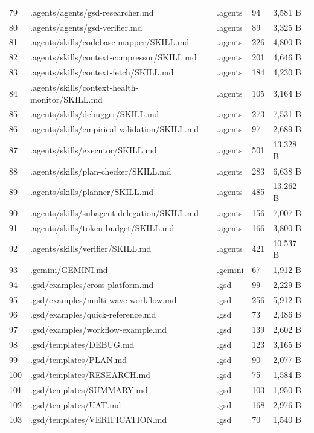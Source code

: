 \documentclass[11pt,a4paper,oneside]{book}
\begin{document}
\begin{longtable}{l l l l l}
79 & .agents/agents/gsd-researcher.md & .agents & 94 & 3,581 B \\
80 & .agents/agents/gsd-verifier.md & .agents & 89 & 3,325 B \\
81 & .agents/skills/codebase-mapper/SKILL.md & .agents & 226 & 4,800 B \\
82 & .agents/skills/context-compressor/SKILL.md & .agents & 201 & 4,646 B \\
83 & .agents/skills/context-fetch/SKILL.md & .agents & 184 & 4,230 B \\
84 & .agents/skills/context-health-monitor/SKILL.md & .agents & 105 & 3,164 B \\
85 & .agents/skills/debugger/SKILL.md & .agents & 273 & 7,531 B \\
86 & .agents/skills/empirical-validation/SKILL.md & .agents & 97 & 2,689 B \\
87 & .agents/skills/executor/SKILL.md & .agents & 501 & 13,328 B \\
88 & .agents/skills/plan-checker/SKILL.md & .agents & 283 & 6,638 B \\
89 & .agents/skills/planner/SKILL.md & .agents & 485 & 13,262 B \\
90 & .agents/skills/subagent-delegation/SKILL.md & .agents & 156 & 7,007 B \\
91 & .agents/skills/token-budget/SKILL.md & .agents & 166 & 3,800 B \\
92 & .agents/skills/verifier/SKILL.md & .agents & 421 & 10,537 B \\
93 & .gemini/GEMINI.md & .gemini & 67 & 1,912 B \\
94 & .gsd/examples/cross-platform.md & .gsd & 99 & 2,229 B \\
95 & .gsd/examples/multi-wave-workflow.md & .gsd & 256 & 5,912 B \\
96 & .gsd/examples/quick-reference.md & .gsd & 73 & 2,486 B \\
97 & .gsd/examples/workflow-example.md & .gsd & 139 & 2,602 B \\
98 & .gsd/templates/DEBUG.md & .gsd & 123 & 3,165 B \\
99 & .gsd/templates/PLAN.md & .gsd & 90 & 2,077 B \\
100 & .gsd/templates/RESEARCH.md & .gsd & 75 & 1,584 B \\
101 & .gsd/templates/SUMMARY.md & .gsd & 103 & 1,950 B \\
102 & .gsd/templates/UAT.md & .gsd & 168 & 2,976 B \\
103 & .gsd/templates/VERIFICATION.md & .gsd & 70 & 1,540 B \\

\end{longtable}
\end{document}
